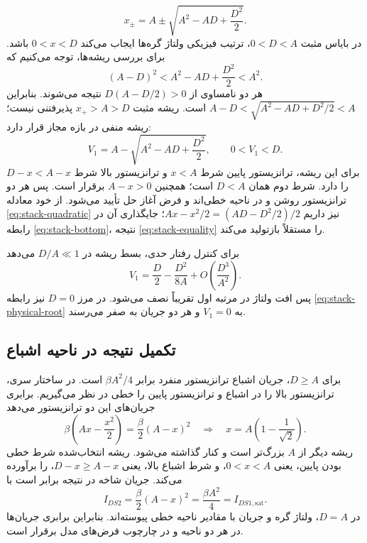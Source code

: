 \begin{equation}
 x_{\pm}=A\pm\sqrt{A^2-AD+\frac{D^2}{2}}.
 \label{eq:stack-roots}
\end{equation}
در بایاس مثبت \(0<D<A\)، ترتیب فیزیکی ولتاژ گره‌ها ایجاب می‌کند \(0<x<D\) باشد.
برای بررسی ریشه‌ها، توجه می‌کنیم که
\begin{equation}
 (A-D)^2<A^2-AD+\frac{D^2}{2}<A^2.
 \label{eq:stack-root-bounds}
\end{equation}
هر دو نامساوی از \(D(A-D/2)>0\) نتیجه می‌شوند.
بنابراین \(A-D<\sqrt{A^2-AD+D^2/2}<A\) است.
ریشه مثبت \(x_+>A>D\) پذیرفتنی نیست؛ ریشه منفی در بازه مجاز قرار دارد:
\begin{equation}
 \boxed{V_1=A-\sqrt{A^2-AD+\frac{D^2}{2}},\qquad 0<V_1<D.}
 \label{eq:stack-physical-root}
\end{equation}
برای این ریشه، ترانزیستور پایین شرط \(x<A\) و ترانزیستور بالا شرط \(D-x<A-x\) را دارد.
شرط دوم همان \(D<A\) است؛ همچنین \(A-x>0\) برقرار است.
پس هر دو ترانزیستور روشن و در ناحیه خطی‌اند و فرض آغاز حل تأیید می‌شود.
از خود معادله \eqref{eq:stack-quadratic} نیز داریم
\(Ax-x^2/2=(AD-D^2/2)/2\)؛ جایگذاری آن در رابطه \eqref{eq:stack-bottom}، نتیجه \eqref{eq:stack-equality} را مستقلاً بازتولید می‌کند.

برای کنترل رفتار حدی، بسط ریشه در \(D/A\ll1\) می‌دهد
\begin{equation}
 V_1=\frac{D}{2}-\frac{D^2}{8A}
 +O\!\left(\frac{D^3}{A^2}\right).
 \label{eq:stack-small-voltage}
\end{equation}
پس افت ولتاژ در مرتبه اول تقریباً نصف می‌شود.
در مرز \(D=0\) نیز رابطه \eqref{eq:stack-physical-root} به \(V_1=0\) و هر دو جریان به صفر می‌رسند.

\subsection*{تکمیل نتیجه در ناحیه اشباع}
برای \(D\ge A\)، جریان اشباع ترانزیستور منفرد برابر \(\beta A^2/4\) است.
در ساختار سری، ترانزیستور بالا را در اشباع و ترانزیستور پایین را خطی در نظر می‌گیریم.
برابری جریان‌های این دو ترانزیستور می‌دهد
\begin{equation}
 \beta\left(Ax-\frac{x^2}{2}\right)=\frac{\beta}{2}(A-x)^2
 \quad\Longrightarrow\quad
 x=A\left(1-\frac{1}{\sqrt{2}}\right).
 \label{eq:stack-saturation-root}
\end{equation}
ریشه دیگر از \(A\) بزرگ‌تر است و کنار گذاشته می‌شود.
ریشه انتخاب‌شده شرط خطی بودن پایین، یعنی \(0<x<A\)، و شرط اشباع بالا، یعنی \(D-x\ge A-x\)، را برآورده می‌کند.
جریان شاخه در نتیجه برابر است با
\begin{equation}
 \boxed{I_{DS2}=\frac{\beta}{2}(A-x)^2
 =\frac{\beta A^2}{4}=I_{DS1,\mathrm{sat}}.}
 \label{eq:stack-saturation-current}
\end{equation}
در \(D=A\)، ولتاژ گره و جریان با مقادیر ناحیه خطی پیوسته‌اند.
بنابراین برابری جریان‌ها در هر دو ناحیه و در چارچوب فرض‌های مدل  برقرار است.

